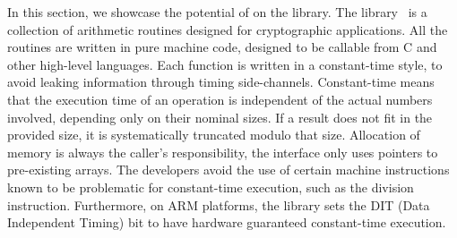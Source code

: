In this section, we showcase the potential of \timesec{} on the \bignum{} library.
%
%
The \bignum{} library~ is a collection of arithmetic routines designed for cryptographic applications.
All the routines are written in pure machine code, designed to be callable from C and other high-level languages.
Each function is written in a constant-time style, to avoid leaking information through timing side-channels.
Constant-time means that the execution time of an \bignum{} operation is independent of the actual numbers involved,
depending only on their nominal sizes.
If a result does not fit in the provided size, it is systematically truncated modulo that size.
Allocation of memory is always the caller's responsibility, the \bignum{} interface only uses pointers to pre-existing arrays.
The developers avoid the use of certain machine instructions known to be problematic for constant-time execution, such as the division instruction.
Furthermore, on ARM platforms, the library sets the DIT (Data Independent Timing) bit to have hardware guaranteed constant-time execution.

